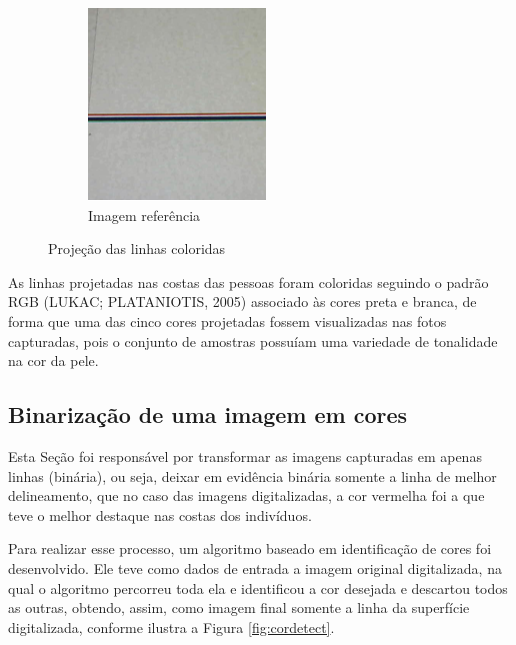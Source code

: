 \documentclass[a4paper, 12pt]{article}
\begin{document}
\begin{figure}[h!]
\begin{subfigure}{.35\textwidth}
      \includegraphics[width=.85\linewidth]{imagem_projecao_colorida_b.png} 
      \caption{Imagem referência}
      \label{imagem_projecao_colorida:b}
    \end{subfigure}
	\caption{Projeção das linhas coloridas}
	\label{imagem_projecao_colorida}
\end{figure}

As linhas projetadas nas costas das pessoas foram coloridas seguindo o padrão RGB (LUKAC; PLATANIOTIS, 2005) associado às cores preta e branca, de forma que uma das cinco cores projetadas fossem visualizadas nas fotos capturadas, pois o conjunto de amostras possuíam uma variedade de tonalidade na cor da pele.


\subsection{Binarização de uma imagem em cores}

Esta Seção foi responsável por transformar as imagens capturadas em apenas linhas (binária), ou seja, deixar em evidência binária somente a linha de melhor delineamento, que no caso das imagens digitalizadas, a cor vermelha foi a que teve o melhor destaque nas costas dos indivíduos.

Para realizar esse processo, um algoritmo baseado em identificação de cores foi desenvolvido. Ele teve como dados de entrada a imagem original digitalizada, na qual o algoritmo percorreu toda ela e identificou a cor desejada e descartou todos as outras, obtendo, assim, como imagem final somente a linha da superfície digitalizada, conforme ilustra a Figura \ref{fig:cordetect}.
\end{document}
